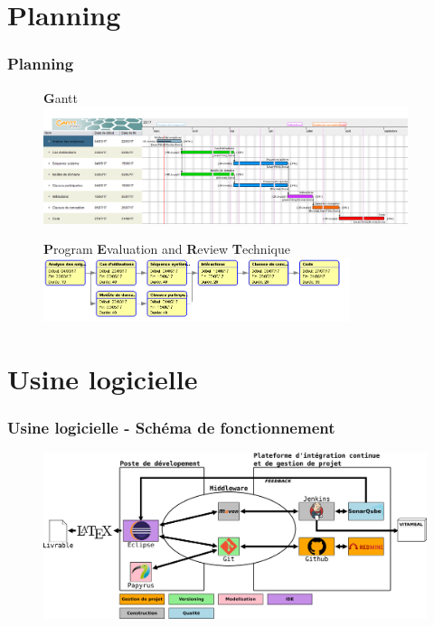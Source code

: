 \documentclass{beamer}
\begin{document}
\section{Planning}
\begin{frame}[label=planning]
\frametitle{Planning}
\begin{figure}[H]
\textbf{G}antt
\label{Gantt}
  \centering
      \includegraphics[width=0.95\textwidth]{Vitameal_gantt.png} %
\end{figure}

\begin{figure}[H]
\textbf{P}rogram \textbf{E}valuation and \textbf{R}eview \textbf{T}echnique
\label{PERT}
  \centering
      \includegraphics[width=0.8\textwidth]{Vitameal_pert.png} %
\end{figure}
\end{frame}

\section{Usine logicielle}
\begin{frame}[label=schemaFonctionnement]
  \frametitle{Usine logicielle - Schéma de fonctionnement}
\begin{figure}[H]
\label{schema}
  \centering
      \includegraphics[width=1.0\textwidth]{usine_vitameal.png} %
\end{figure}
\end{frame}
\end{document}
